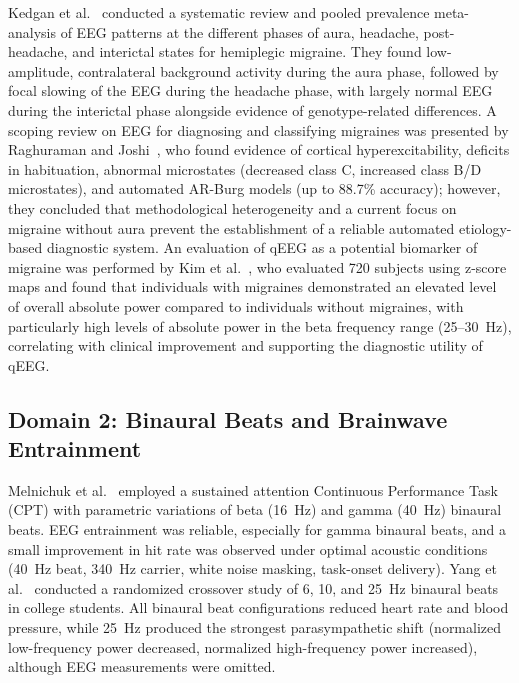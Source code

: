 \documentclass[12pt, a4paper]{report}
\begin{document}
Kedgan et al.~\cite{Kedgan2025} conducted a systematic review and pooled prevalence meta-analysis of EEG patterns at the different phases of aura, headache, post-headache, and interictal states for hemiplegic migraine. They found low-amplitude, contralateral background activity during the aura phase, followed by focal slowing of the EEG during the headache phase, with largely normal EEG during the interictal phase alongside evidence of genotype-related differences. A scoping review on EEG for diagnosing and classifying migraines was presented by Raghuraman and Joshi~\cite{RaghuramanJoshi2024}, who found evidence of cortical hyperexcitability, deficits in habituation, abnormal microstates (decreased class C, increased class B/D microstates), and automated AR-Burg models (up to 88.7\% accuracy); however, they concluded that methodological heterogeneity and a current focus on migraine without aura prevent the establishment of a reliable automated etiology-based diagnostic system. An evaluation of qEEG as a potential biomarker of migraine was performed by Kim et al.~\cite{Kim2023}, who evaluated 720 subjects using z-score maps and found that individuals with migraines demonstrated an elevated level of overall absolute power compared to individuals without migraines, with particularly high levels of absolute power in the beta frequency range (25--30~Hz), correlating with clinical improvement and supporting the diagnostic utility of qEEG.

\subsection{Domain 2: Binaural Beats and Brainwave Entrainment}
\label{subsec:lit_binaural_beats}
Melnichuk et al.~\cite{Melnichuk2025} employed a sustained attention Continuous Performance Task (CPT) with parametric variations of beta (16~Hz) and gamma (40~Hz) binaural beats. EEG entrainment was reliable, especially for gamma binaural beats, and a small improvement in hit rate was observed under optimal acoustic conditions (40~Hz beat, 340~Hz carrier, white noise masking, task-onset delivery). Yang et al.~\cite{Yang2025} conducted a randomized crossover study of 6, 10, and 25~Hz binaural beats in college students. All binaural beat configurations reduced heart rate and blood pressure, while 25~Hz produced the strongest parasympathetic shift (normalized low-frequency power decreased, normalized high-frequency power increased), although EEG measurements were omitted.
\end{document}
